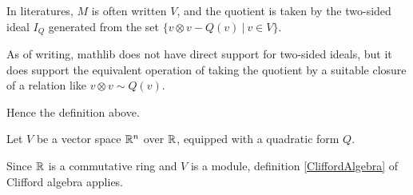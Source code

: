 \begin{remark}
  \label{mk:two_sided_ideals}
  
  In literatures, $M$ is often written $V$, and the quotient is taken by the two-sided ideal $I_Q$ generated from the set
  $\{ v \otimes v - Q(v) \:\vert\: v \in V \}$.

  As of writing, mathlib does not have direct support for two-sided ideals,
  but it does support the equivalent operation of taking the quotient by a suitable closure of
  a relation like $v \otimes v \sim Q(v)$.

  Hence the definition above.

\end{remark}

\begin{example}
  \label{ex:clifford_algebra_v}

  Let $V$ be a vector space $\mathbb R^n$ over $\mathbb R$, equipped with a quadratic form $Q$.
  
  Since $\mathbb R$ is a commutative ring and $V$ is a module,
  definition \ref{CliffordAlgebra} of Clifford algebra applies.
\end{example}
